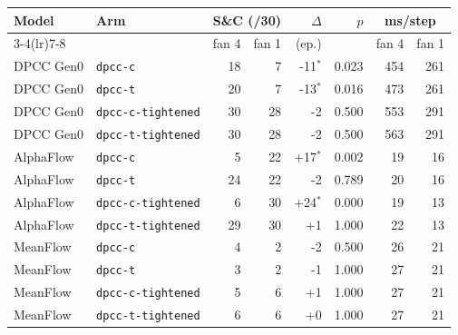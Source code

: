 \begin{tabular}{llrrrrrr}
\toprule
Model & Arm & \multicolumn{2}{c}{S\&C (/30)} & $\Delta$ & $p$ & \multicolumn{2}{c}{ms/step} \\
\cmidrule(lr){3-4}\cmidrule(lr){7-8}
 &  & fan 4 & fan 1 & (ep.) &  & fan 4 & fan 1 \\
\midrule
\addlinespace
DPCC Gen0 & \texttt{dpcc-c} & 18 & 7 & -11$^{*}$ & 0.023 & 454 & 261 \\
DPCC Gen0 & \texttt{dpcc-t} & 20 & 7 & -13$^{*}$ & 0.016 & 473 & 261 \\
DPCC Gen0 & \texttt{dpcc-c-tightened} & 30 & 28 & -2 & 0.500 & 553 & 291 \\
DPCC Gen0 & \texttt{dpcc-t-tightened} & 30 & 28 & -2 & 0.500 & 563 & 291 \\
\addlinespace
AlphaFlow & \texttt{dpcc-c} & 5 & 22 & +17$^{*}$ & 0.002 & 19 & 16 \\
AlphaFlow & \texttt{dpcc-t} & 24 & 22 & -2 & 0.789 & 20 & 16 \\
AlphaFlow & \texttt{dpcc-c-tightened} & 6 & 30 & +24$^{*}$ & 0.000 & 19 & 13 \\
AlphaFlow & \texttt{dpcc-t-tightened} & 29 & 30 & +1 & 1.000 & 22 & 13 \\
\addlinespace
MeanFlow & \texttt{dpcc-c} & 4 & 2 & -2 & 0.500 & 26 & 21 \\
MeanFlow & \texttt{dpcc-t} & 3 & 2 & -1 & 1.000 & 27 & 21 \\
MeanFlow & \texttt{dpcc-c-tightened} & 5 & 6 & +1 & 1.000 & 27 & 21 \\
MeanFlow & \texttt{dpcc-t-tightened} & 6 & 6 & +0 & 1.000 & 27 & 21 \\
\bottomrule
\end{tabular}

